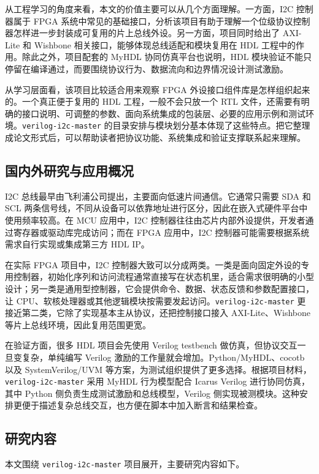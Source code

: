 \documentclass[12pt,a4paper]{article}
\numberwithin{equation}{section}
\begin{document}
从工程学习的角度来看，本文的价值主要可以从几个方面理解。一方面，I2C 控制器属于 FPGA 系统中常见的基础接口，分析该项目有助于理解一个位级协议控制器怎样进一步封装成可复用的片上总线外设。另一方面，项目同时给出了 AXI-Lite 和 Wishbone 相关接口，能够体现总线适配和模块复用在 HDL 工程中的作用。除此之外，项目配套的 MyHDL 协同仿真平台也说明，HDL 模块验证不能只停留在编译通过，而要围绕协议行为、数据流向和边界情况设计测试激励。

从学习层面看，该项目比较适合用来观察 FPGA 外设接口组件库是怎样组织起来的。一个真正便于复用的 HDL 工程，一般不会只放一个 RTL 文件，还需要有明确的接口说明、可调整的参数、面向系统集成的包装层、必要的应用示例和测试环境。\texttt{verilog-i2c-master} 的目录安排与模块划分基本体现了这些特点。把它整理成论文形式后，可以帮助读者把协议功能、系统集成和验证支撑联系起来理解。

\subsection{国内外研究与应用概况}

I2C 总线最早由飞利浦公司提出，主要面向低速片间通信。它通常只需要 SDA 和 SCL 两条信号线，不同从设备可以依靠地址进行区分，因此在嵌入式硬件平台中使用频率较高。在 MCU 应用中，I2C 控制器往往由芯片内部外设提供，开发者通过寄存器或驱动库完成访问；而在 FPGA 应用中，I2C 控制器可能需要根据系统需求自行实现或集成第三方 HDL IP。

在实际 FPGA 项目中，I2C 控制器大致可以分成两类。一类是面向固定外设的专用控制器，初始化序列和访问流程通常直接写在状态机里，适合需求很明确的小型设计；另一类是通用型控制器，它会提供命令、数据、状态反馈和参数配置接口，让 CPU、软核处理器或其他逻辑模块按需要发起访问。\texttt{verilog-i2c-master} 更接近第二类，它除了实现基本主从协议，还把控制接口接入 AXI-Lite、Wishbone 等片上总线环境，因此复用范围更宽。

在验证方面，很多 HDL 项目会先使用 Verilog testbench 做仿真，但协议交互一旦变复杂，单纯编写 Verilog 激励的工作量就会增加。Python/MyHDL、cocotb 以及 SystemVerilog/UVM 等方案，为测试组织提供了更多选择。根据项目材料，\texttt{verilog-i2c-master} 采用 MyHDL 行为模型配合 Icarus Verilog 进行协同仿真，其中 Python 侧负责生成测试激励和总线模型，Verilog 侧实现被测模块。这种安排更便于描述复杂总线交互，也方便在脚本中加入断言和结果检查。

\subsection{研究内容}

本文围绕 \texttt{verilog-i2c-master} 项目展开，主要研究内容如下。
\end{document}

